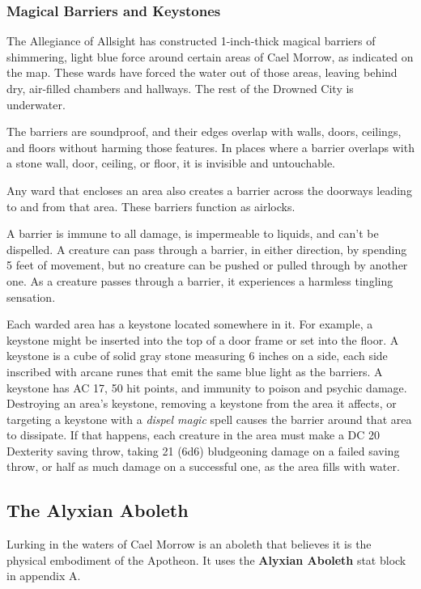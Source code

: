 \documentclass[10pt,a4paper,twoside,fancy,bg=print,twocolumn,openany,nodeprecatedcode]{dndbook}
\begin{document}
\subsubsection{Magical Barriers and Keystones}
The Allegiance of Allsight has constructed 1-inch-thick magical barriers of shimmering, light blue force around certain areas of Cael Morrow, as indicated on the map. These wards have forced the water out of those areas, leaving behind dry, air-filled chambers and hallways. The rest of the Drowned City is underwater.

The barriers are soundproof, and their edges overlap with walls, doors, ceilings, and floors without harming those features. In places where a barrier overlaps with a stone wall, door, ceiling, or floor, it is invisible and untouchable.

Any ward that encloses an area also creates a barrier across the doorways leading to and from that area. These barriers function as airlocks.

A barrier is immune to all damage, is impermeable to liquids, and can't be dispelled. A creature can pass through a barrier, in either direction, by spending 5 feet of movement, but no creature can be pushed or pulled through by another one. As a creature passes through a barrier, it experiences a harmless tingling sensation.

Each warded area has a keystone located somewhere in it. For example, a keystone might be inserted into the top of a door frame or set into the floor. A keystone is a cube of solid gray stone measuring 6 inches on a side, each side inscribed with arcane runes that emit the same blue light as the barriers. A keystone has AC 17, 50 hit points, and immunity to poison and psychic damage. Destroying an area's keystone, removing a keystone from the area it affects, or targeting a keystone with a \textit{dispel magic} spell causes the barrier around that area to dissipate. If that happens, each creature in the area must make a DC 20 Dexterity saving throw, taking 21 (6d6) bludgeoning damage on a failed saving throw, or half as much damage on a successful one, as the area fills with water.

\subsection{The Alyxian Aboleth}
Lurking in the waters of Cael Morrow is an aboleth that believes it is the physical embodiment of the Apotheon. It uses the \textbf{Alyxian Aboleth} stat block in appendix A.
\end{document}
